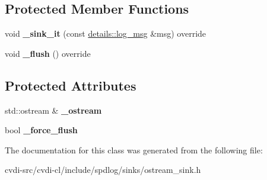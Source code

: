 \subsection*{Protected Member Functions}
\begin{DoxyCompactItemize}
\item 
void {\bfseries \+\_\+sink\+\_\+it} (const \hyperlink{structspdlog_1_1details_1_1log__msg}{details\+::log\+\_\+msg} \&msg) override\hypertarget{classspdlog_1_1sinks_1_1ostream__sink_afa766b268315152fc4ed53c5d42907b3}{}\label{classspdlog_1_1sinks_1_1ostream__sink_afa766b268315152fc4ed53c5d42907b3}

\item 
void {\bfseries \+\_\+flush} () override\hypertarget{classspdlog_1_1sinks_1_1ostream__sink_a5d9f4f269c3ba7d279c224b91c2c6af7}{}\label{classspdlog_1_1sinks_1_1ostream__sink_a5d9f4f269c3ba7d279c224b91c2c6af7}

\end{DoxyCompactItemize}
\subsection*{Protected Attributes}
\begin{DoxyCompactItemize}
\item 
std\+::ostream \& {\bfseries \+\_\+ostream}\hypertarget{classspdlog_1_1sinks_1_1ostream__sink_a2007a7bade3e74b6a003ae27ed621c8f}{}\label{classspdlog_1_1sinks_1_1ostream__sink_a2007a7bade3e74b6a003ae27ed621c8f}

\item 
bool {\bfseries \+\_\+force\+\_\+flush}\hypertarget{classspdlog_1_1sinks_1_1ostream__sink_a9db02c29caf37c1e69e38d397006ae1f}{}\label{classspdlog_1_1sinks_1_1ostream__sink_a9db02c29caf37c1e69e38d397006ae1f}

\end{DoxyCompactItemize}


The documentation for this class was generated from the following file\+:\begin{DoxyCompactItemize}
\item 
cvdi-\/src/cvdi-\/cl/include/spdlog/sinks/ostream\+\_\+sink.\+h\end{DoxyCompactItemize}
